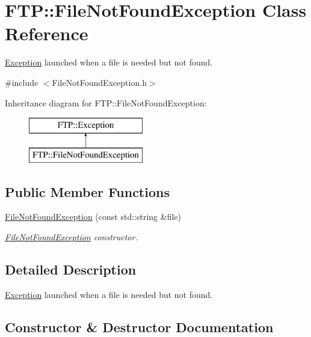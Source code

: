 \hypertarget{classFTP_1_1FileNotFoundException}{}\section{F\+T\+P\+:\+:File\+Not\+Found\+Exception Class Reference}
\label{classFTP_1_1FileNotFoundException}


\hyperlink{classFTP_1_1Exception}{Exception} launched when a file is needed but not found.  




{\ttfamily \#include $<$File\+Not\+Found\+Exception.\+h$>$}

Inheritance diagram for F\+T\+P\+:\+:File\+Not\+Found\+Exception\+:\begin{figure}[H]
\begin{center}
\leavevmode
\includegraphics[height=2.000000cm]{classFTP_1_1FileNotFoundException}
\end{center}
\end{figure}
\subsection*{Public Member Functions}
\begin{DoxyCompactItemize}
\item 
\hyperlink{classFTP_1_1FileNotFoundException_aad708c1cca717cbff7eb2ce33978536e}{File\+Not\+Found\+Exception} (const std\+::string \&file)
\begin{DoxyCompactList}\small\item\em \hyperlink{classFTP_1_1FileNotFoundException}{File\+Not\+Found\+Exception} constructor. \end{DoxyCompactList}\end{DoxyCompactItemize}


\subsection{Detailed Description}
\hyperlink{classFTP_1_1Exception}{Exception} launched when a file is needed but not found. 

\subsection{Constructor \& Destructor Documentation}
\hypertarget{classFTP_1_1FileNotFoundException_aad708c1cca717cbff7eb2ce33978536e}{}
